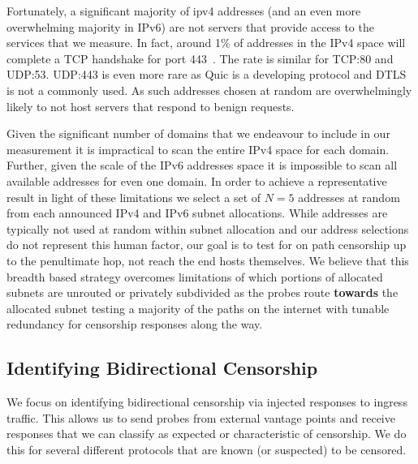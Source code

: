 Fortunately, a significant majority of ipv4 addresses (and an even more
overwhelming majority in IPv6) are not servers that provide access to the
services that we measure. In fact, around 1\% of addresses in the IPv4 space
will complete a TCP handshake for port 443~\cite{}. The rate is similar for
TCP:80 and UDP:53. UDP:443 is even more rare as Quic is a developing
protocol and DTLS is not a commonly used. As such addresses chosen at random are
overwhelmingly likely to not host servers that respond to benign requests.

Given the significant number of domains that we endeavour to include in our
measurement it is impractical to scan the entire IPv4 space for each domain.
Further, given the scale of the IPv6 addresses space it is impossible to scan
all available addresses for even one domain. In order to achieve a
representative result in light of these limitations we select a set of $N=5$
addresses at random from each announced IPv4 and IPv6 subnet allocations. While
addresses are typically not used at random within subnet allocation and our
address selections do not represent this human factor, our goal is to test for
on path censorship up to the penultimate hop, not reach the end hosts
themselves. We believe that this breadth based strategy overcomes limitations of
which portions of allocated subnets are unrouted or privately subdivided as the
probes route {\bf towards} the allocated subnet testing a majority of the paths
on the internet with tunable redundancy for censorship responses along the way.

\subsection{Identifying Bidirectional Censorship}
\label{sec:methodology:censorship}

We focus on identifying bidirectional censorship via injected responses to
ingress traffic. This allows us to send probes from external vantage points and
receive responses that we can classify as expected or characteristic of
censorship. We do this for several different protocols that are known (or
suspected) to be censored.


